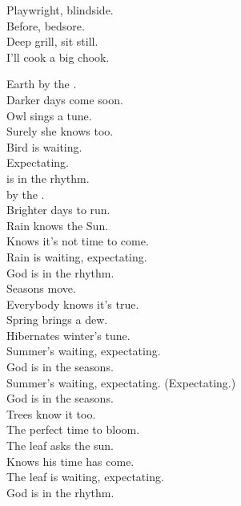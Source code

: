Playwright, blindside. \\
Before, bedsore. \\
Deep grill, sit still. \\
I'll cook a big chook. \\




Earth by the . \\
Darker days come soon. \\
Owl sings a tune. \\
Surely she knows too. \\

Bird is waiting. \\
Expectating. \\
 is in the rhythm. \\

 by the . \\
Brighter days to run. \\
Rain knows the Sun. \\
Knows it's not time to come. \\

Rain is waiting, expectating. \\
God is in the rhythm. \\

Seasons move. \\
Everybody knows it's true. \\
Spring brings a dew. \\
Hibernates winter's tune. \\

Summer's waiting, expectating. \\
God is in the seasons. \\

Summer's waiting, expectating. (Expectating.) \\
God is in the seasons. \\

Trees know it too. \\
The perfect time to bloom. \\
The leaf asks the sun. \\
Knows his time has come. \\

The leaf is waiting, expectating. \\
God is in the rhythm. \\

